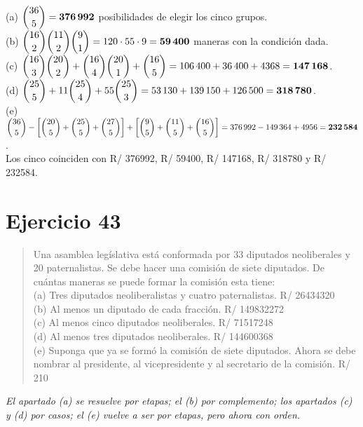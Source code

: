 \documentclass[11pt]{article}
\begin{document}
\begin{resp}
(a) $\dbinom{36}{5}=\mathbf{376\,992}$ posibilidades de elegir los cinco grupos.\\[2pt]
(b) $\dbinom{16}{2}\dbinom{11}{2}\dbinom{9}{1}=120\cdot 55\cdot 9=\mathbf{59\,400}$ maneras con la condición dada.\\[2pt]
(c) $\dbinom{16}{3}\dbinom{20}{2}+\dbinom{16}{4}\dbinom{20}{1}+\dbinom{16}{5}=106\,400+36\,400+4368=\mathbf{147\,168}$.\\[2pt]
(d) $\dbinom{25}{5}+11\dbinom{25}{4}+55\dbinom{25}{3}=53\,130+139\,150+126\,500=\mathbf{318\,780}$.\\[2pt]
(e) $\dbinom{36}{5}-\left[\dbinom{20}{5}+\dbinom{25}{5}+\dbinom{27}{5}\right]+\left[\dbinom{9}{5}+\dbinom{11}{5}+\dbinom{16}{5}\right]=376\,992-149\,364+4956=\mathbf{232\,584}$.\\[2pt]
Los cinco coinciden con R/ 376992, R/ 59400, R/ 147168, R/ 318780 y R/ 232584.
\end{resp}

\section*{Ejercicio 43}

\begin{quote}
Una asamblea legíslativa está conformada por 33 diputados neoliberales y 20 paternalistas. Se debe hacer una comisión de siete diputados. De cuántas maneras se puede formar la comisión esta tiene:\\[2pt]
(a) Tres diputados neoliberalistas y cuatro paternalistas. \hfill R/ 26434320\\
(b) Al menos un diputado de cada fracción. \hfill R/ 149832272\\
(c) Al menos cinco diputados neoliberales. \hfill R/ 71517248\\
(d) Al menos tres diputados neoliberales. \hfill R/ 144600368\\
(e) Suponga que ya se formó la comisión de siete diputados. Ahora se debe nombrar al presidente, al vicepresidente y al secretario de la comisión. \hfill R/ 210
\end{quote}

\emph{El apartado (a) se resuelve por etapas; el (b) por complemento; los apartados (c) y (d) por casos; el (e) vuelve a ser por etapas, pero ahora con orden.}
\end{document}
